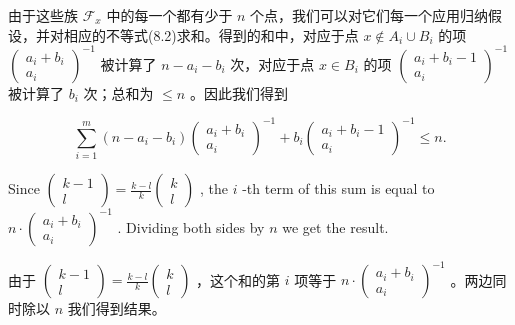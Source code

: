 \documentclass[10pt]{article}
\begin{document}
\begin{tcolorbox}\relax
由于这些族 \({\mathcal{F}}_{x}\) 中的每一个都有少于 \(n\) 个点，我们可以对它们每一个应用归纳假设，并对相应的不等式(8.2)求和。得到的和中，对应于点 \(x \notin  {A}_{i} \cup  {B}_{i}\) 的项 \({\left( \begin{matrix} {a}_{i} + {b}_{i} \\  {a}_{i} \end{matrix}\right) }^{-1}\) 被计算了 \(n - {a}_{i} - {b}_{i}\) 次，对应于点 \(x \in  {B}_{i}\) 的项 \({\left( \begin{matrix} {a}_{i} + {b}_{i} - 1 \\  {a}_{i} \end{matrix}\right) }^{-1}\) 被计算了 \({b}_{i}\) 次；总和为 \(\leq  n\) 。因此我们得到
\end{tcolorbox}

\[
\mathop{\sum }\limits_{{i = 1}}^{m}\left( {n - {a}_{i} - {b}_{i}}\right) {\left( \begin{matrix} {a}_{i} + {b}_{i} \\  {a}_{i} \end{matrix}\right) }^{-1} + {b}_{i}{\left( \begin{matrix} {a}_{i} + {b}_{i} - 1 \\  {a}_{i} \end{matrix}\right) }^{-1} \leq  n.
\]

Since \(\left( \begin{matrix} k - 1 \\  l \end{matrix}\right)  = \frac{k - l}{k}\left( \begin{array}{l} k \\  l \end{array}\right)\) , the \(i\) -th term of this sum is equal to \(n \cdot  {\left( \begin{matrix} {a}_{i} + {b}_{i} \\  {a}_{i} \end{matrix}\right) }^{-1}\) . Dividing both sides by \(n\) we get the result.

\begin{tcolorbox}\relax
由于 \(\left( \begin{matrix} k - 1 \\  l \end{matrix}\right)  = \frac{k - l}{k}\left( \begin{array}{l} k \\  l \end{array}\right)\) ，这个和的第 \(i\) 项等于 \(n \cdot  {\left( \begin{matrix} {a}_{i} + {b}_{i} \\  {a}_{i} \end{matrix}\right) }^{-1}\) 。两边同时除以 \(n\) 我们得到结果。
\end{tcolorbox}
\end{document}

